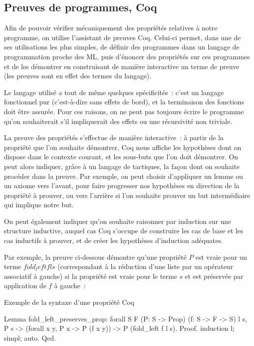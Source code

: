 \documentclass{article}
\begin{document}
\subsection{Preuves de programmes, Coq}

Afin de pouvoir vérifier mécaniquement des propriétés relatives à notre
programme, on utilise l'assistant de preuves Coq. Celui-ci permet, dans une de
ses utilisations les plus simples, de définir des programmes dans un langage de
programmation proche des ML, puis d'énoncer des propriétés sur ces programmes
et de les démontrer en construisant de manière interactive un terme de preuve
(les preuves sont en effet des termes du langage).

Le langage utilisé a tout de même quelques spécificités~: c'est un langage
fonctionnel pur (c'est-à-dire sans effets de bord), et la terminaison des
fonctions doit être assurée. Pour ces raisons, on ne peut pas toujours écrire
le programme qu'on souhaiterait s'il impliquerait des effets ou une récursivité
non triviale.

La preuve des propriétés s'effectue de manière interactive~: à partir de la
propriété que l'on souhaite démontrer, Coq nous affiche les hypothèses dont on
dispose dans le contexte courant, et les sous-buts que l'on doit démontrer. On
peut alors indiquer, grâce à un langage de tactiques, la façon dont on souhaite
procéder dans la preuve. Par exemple, on peut choisir d'appliquer un lemme ou
un axiome vers l'avant, pour faire progresser nos hypothèses en direction de la
propriété à prouver, ou vers l'arrière si l'on souhaite prouver un but
intermédiaire qui implique notre but.

On peut également indiquer qu'on souhaite raisonner par induction sur une
structure inductive, auquel cas Coq s'occupe de construire les cas de base et
les cas inductifs à prouver, et de créer les hypothèses d'induction adéquates.

Par exemple, la preuve ci-dessous démontre qu'une propriété $P$ est
vraie pour un terme $fold_left f l s$ (correspondant à la réduction
d'une liste par un opérateur associatif à gauche) si la propriété est vraie
pour le terme $s$ et est préservée par application de $f$ à
gauche~:

\begin{coqcode}
\caption{Exemple de la syntaxe d'une propriété Coq}
\begin{english}
\begin{coq}
Lemma fold_left_preserves_prop:
forall S F (P: S -> Prop) (f: S -> F -> S) l s,
  P s ->
  (forall x y, P x -> P (f x y)) ->
  P (fold_left f l s).
Proof.
induction l; simpl; auto.
Qed.
\end{coq}
\end{english}
\end{coqcode}
\end{document}
